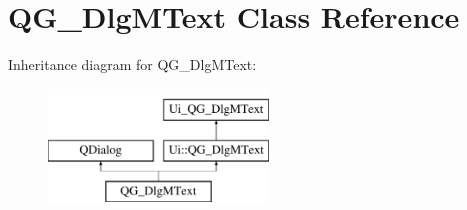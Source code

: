 \hypertarget{classQG__DlgMText}{\section{Q\-G\-\_\-\-Dlg\-M\-Text Class Reference}
\label{classQG__DlgMText}
}
Inheritance diagram for Q\-G\-\_\-\-Dlg\-M\-Text\-:\begin{figure}[H]
\begin{center}
\leavevmode
\includegraphics[height=3.000000cm]{classQG__DlgMText}
\end{center}
\end{figure}
